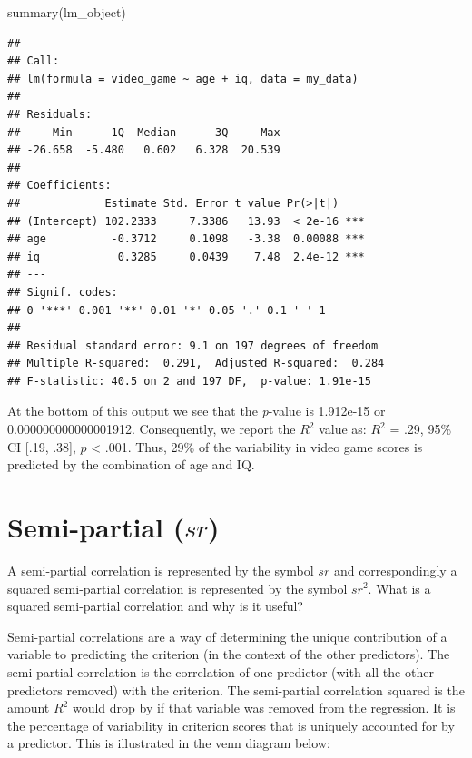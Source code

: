 \documentclass[
]{krantz}
\makeatletter
\newenvironment{Shaded}{\begin{snugshade}}{\end{snugshade}}
\newcommand{\FunctionTok}[1]{\textcolor[rgb]{0,0,0}{#1}}
\newcommand{\NormalTok}[1]{#1}
\newenvironment{kframe}{%
\medskip{}
\setlength{\fboxsep}{.8em}
 \def\at@end@of@kframe{}%
 \ifinner\ifhmode%
  \def\at@end@of@kframe{\end{minipage}}%
  \begin{minipage}{\columnwidth}%
 \fi\fi%
 \def\FrameCommand##1{\hskip\@totalleftmargin \hskip-\fboxsep
 \colorbox{shadecolor}{##1}\hskip-\fboxsep
     \hskip-\linewidth \hskip-\@totalleftmargin \hskip\columnwidth}%
 \MakeFramed {\advance\hsize-\width
   \@totalleftmargin\z@ \linewidth\hsize
   \@setminipage}}%
 {\par\unskip\endMakeFramed%
 \at@end@of@kframe}
\renewenvironment{Shaded}{\begin{kframe}}{\end{kframe}}
\makeatother
\begin{document}
\begin{Shaded}
\begin{Highlighting}[]
\FunctionTok{summary}\NormalTok{(lm\_object)}
\end{Highlighting}
\end{Shaded}

\begin{verbatim}
## 
## Call:
## lm(formula = video_game ~ age + iq, data = my_data)
## 
## Residuals:
##     Min      1Q  Median      3Q     Max 
## -26.658  -5.480   0.602   6.328  20.539 
## 
## Coefficients:
##             Estimate Std. Error t value Pr(>|t|)    
## (Intercept) 102.2333     7.3386   13.93  < 2e-16 ***
## age          -0.3712     0.1098   -3.38  0.00088 ***
## iq            0.3285     0.0439    7.48  2.4e-12 ***
## ---
## Signif. codes:  
## 0 '***' 0.001 '**' 0.01 '*' 0.05 '.' 0.1 ' ' 1
## 
## Residual standard error: 9.1 on 197 degrees of freedom
## Multiple R-squared:  0.291,  Adjusted R-squared:  0.284 
## F-statistic: 40.5 on 2 and 197 DF,  p-value: 1.91e-15
\end{verbatim}

At the bottom of this output we see that the \emph{p}-value is 1.912e-15 or 0.000000000000001912. Consequently, we report the \(R^2\) value as: \(R^2\) = .29, 95\% CI {[}.19, .38{]}, \(p\) \textless{} .001. Thus, 29\% of the variability in video game scores is predicted by the combination of age and IQ.

\hypertarget{semi-partial-sr}{%
\section{\texorpdfstring{Semi-partial (\(sr\))}{Semi-partial (sr)}}\label{semi-partial-sr}}

A semi-partial correlation is represented by the symbol \(sr\) and correspondingly a squared semi-partial correlation is represented by the symbol \(sr^2\). What is a squared semi-partial correlation and why is it useful?

Semi-partial correlations are a way of determining the unique contribution of a variable to predicting the criterion (in the context of the other predictors). The semi-partial correlation is the correlation of one predictor (with all the other predictors removed) with the criterion. The semi-partial correlation squared is the amount \(R^2\) would drop by if that variable was removed from the regression. It is the percentage of variability in criterion scores that is uniquely accounted for by a predictor. This is illustrated in the venn diagram below:
\end{document}
